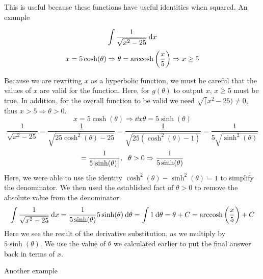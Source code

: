 \documentclass[12pt]{report}
\begin{document}
\begin{flushleft}
This is useful because these functions have useful identities when squared. An
example

\[\int\frac{1}{\sqrt{x^2 - 25}}\:\mathrm{d}x\]
\[x = 5\cosh(\theta) \Rightarrow \theta = \operatorname{arccosh}\left(\frac{x}{5}\right)
\Rightarrow x \geq 5\]
\begin{center}
Because we are rewriting \(x\) as a hyperbolic function, we must be careful
that the values of \(x\) are valid for the function. Here, for 
\(g(\theta)\) to output \(x\), \(x\geq5\) must be true. In addition, for
the overall function to be valid we need \(\sqrt(x^2 - 25) \neq 0\), thus
\(x > 5 \Rightarrow \theta > 0\).
\[x = 5\cosh(\theta) \Rightarrow \dd{x}{\theta} = 5\sinh(\theta)\]
\[\frac{1}{\sqrt{x^2 - 25}} = \frac{1}{\sqrt{25\cosh^2(\theta) - 25}} =
\frac{1}{\sqrt{25(\cosh^2(\theta) - 1)}} = \frac{1}{5\sqrt{\sinh^2(\theta)}}\] 
\[= \frac{1}{5\abs{\sinh(\theta)}}, \:\:\: \theta > 0 \Rightarrow
\frac{1}{5\sinh(\theta)}\]
Here, we were able to use the identity 
\(\cosh^2(\theta) - \sinh^2(\theta) = 1\) to simplify the denominator. We
then used the established fact of \(\theta > 0\) to remove the absolute
value from the denominator.
\[\int\frac{1}{\sqrt{x^2 - 25}}\:\mathrm{d}x 
= \frac{1}{5\sinh(\theta)}5\sinh(\theta)\:\mathrm{d}\theta
= \int 1 \:\mathrm{d}\theta = \theta + C 
= \operatorname{arccosh}\left(\frac{x}{5}\right) + C\]
Here we see the result of the derivative substitution, as we multiply by
\(5\sinh(\theta)\). We use the value of \(\theta\) we calculated earlier to
put the final answer back in terms of \(x\).        
\end{center}

Another example


\end{flushleft}
\end{document}
